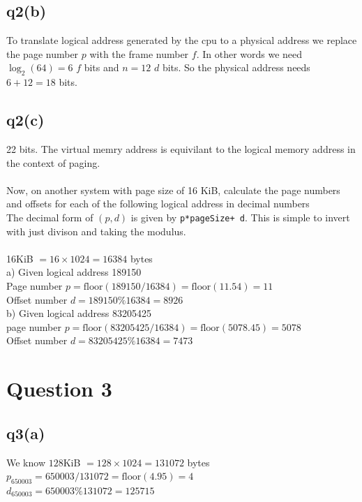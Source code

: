 \documentclass{assignment}
\def\code#1{\texttt{#1}}
\begin{document}
\subsection*{q2(b)}
To translate logical address generated by the cpu to a physical address we replace the page number $p$ with the
frame number $f$. In other words we need $\log_2(64) = 6$ $f$ bits and $n=12$ $d$ bits. 
So the physical address needs $6 + 12 = 18$ bits.

\subsection*{q2(c)}
22 bits. The virtual memry address is equivilant to the logical memory address in the context of paging. \\ \\
Now, on another system with page size of 16 KiB, calculate the page numbers and
offsets for each of the following logical address in decimal numbers \\
The decimal form of $(p,d)$ is given by \code{p*pageSize+ d}. This is simple to invert with just divison and taking the modulus. \\ \\
16KiB $= 16 \times 1024 = 16384$ bytes \\
a) Given logical address 189150 \\
Page number $p = \text{floor}(189150 / 16384) = \text{floor}(11.54) = 11$ \\
Offset number $d = 189150 \% 16384 = 8926$ \\
b) Given logical address 83205425 \\
page number $p = \text{floor}(83205425/16384) = \text{floor}(5078.45) = 5078$ \\
Offset number $d = 83205425 \% 16384 = 7473$



\section*{Question 3}

\subsection*{q3(a)}
We know $128$KiB $ = 128 \times 1024 = 131072$ bytes \\
$p_{650003} = 650003 / 131072 = \text{floor}(4.95) = 4$ \\
$d_{650003} =  650003 \% 131072 =  125715$ \\
\end{document}
